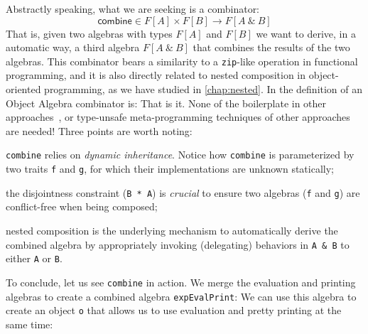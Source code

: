 Abstractly speaking, what we are seeking is a combinator:
\[
  \mathsf{combine} \in F[A] \times F[B] \rightarrow F[A\ \&\ B]
\]
That is, given two algebras with types $F[A]$ and $F[B]$ we want to
derive, in a automatic way, a third algebra $F[A\ \&\ B]$ that combines the results
of the two algebras. This combinator bears a similarity to a
\lstinline{zip}-like operation in functional programming, and it is also directly
related to nested composition in object-oriented programming, as we have studied
in \cref{chap:nested}. In \sedel the definition of an Object Algebra combinator is:
That is it. None of the boilerplate in other
approaches~\citep{oliveira2012extensibility}, or type-unsafe meta-programming
techniques of other approaches~\citep{oliveira2013feature,rendel14attributes} are
needed! Three points are worth noting:
\begin{inparaenum}[(1)]
\item \lstinline{combine} relies on \emph{dynamic inheritance}. Notice how
  \lstinline{combine} is parameterized by two traits \lstinline{f} and \lstinline{g}, for
  which their implementations are unknown statically;
\item the disjointness constraint (\lstinline{B * A}) is \emph{crucial} to
  ensure two algebras (\lstinline{f} and \lstinline{g}) are conflict-free
  when being composed;
\item nested composition is the underlying mechanism to automatically derive the
  combined algebra by appropriately invoking (delegating) behaviors in \lstinline{A & B} to either \lstinline{A} or \lstinline{B}.
\end{inparaenum}
To conclude, let us see \lstinline{combine} in action. We merge the evaluation
and printing algebras to create a combined algebra \lstinline{expEvalPrint}:
We can use this algebra to create an object \lstinline{o} that allows us to use
evaluation and pretty printing at the same time:




